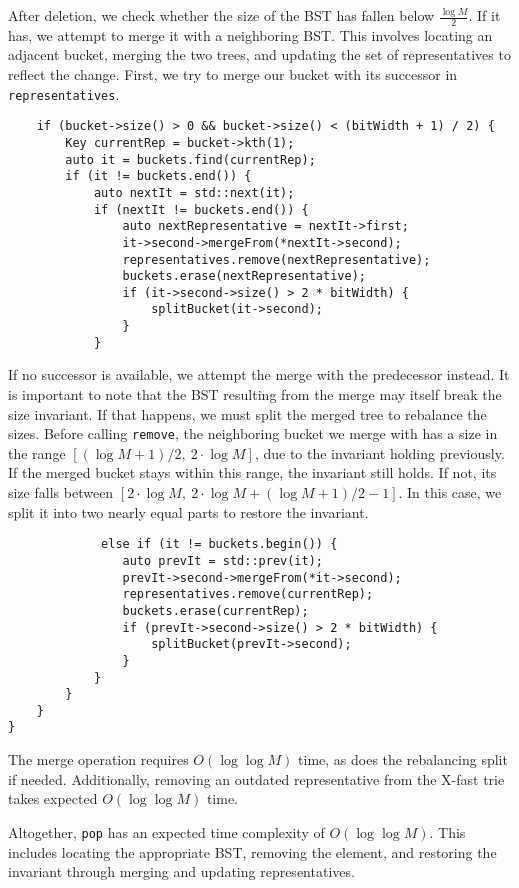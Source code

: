 After deletion, we check whether the size of the BST has fallen below \( \frac{\log M}{2} \). If it has, we attempt to merge it with a neighboring BST. This involves locating an adjacent bucket, merging the two trees, and updating the set of representatives to reflect the change. First, we try to merge our bucket with its successor in \texttt{representatives}.

\begin{verbatim}
    if (bucket->size() > 0 && bucket->size() < (bitWidth + 1) / 2) {
        Key currentRep = bucket->kth(1);
        auto it = buckets.find(currentRep);
        if (it != buckets.end()) {
            auto nextIt = std::next(it);
            if (nextIt != buckets.end()) {
                auto nextRepresentative = nextIt->first;
                it->second->mergeFrom(*nextIt->second);
                representatives.remove(nextRepresentative);
                buckets.erase(nextRepresentative);
                if (it->second->size() > 2 * bitWidth) {
                    splitBucket(it->second);
                }
            }
\end{verbatim}

If no successor is available, we attempt the merge with the predecessor instead. It is important to note that the BST resulting from the merge may itself break the size invariant. If that happens, we must split the merged tree to rebalance the sizes. Before calling \texttt{remove}, the neighboring bucket we merge with has a size in the range \([(\log M + 1)/2,\ 2 \cdot \log M ]\), due to the invariant holding previously. If the merged bucket stays within this range, the invariant still holds. If not, its size falls between \([ 2 \cdot \log M,\ 2 \cdot \log M + (\log M + 1)/2 - 1 ]\). In this case, we split it into two nearly equal parts to restore the invariant.

\begin{verbatim}
             else if (it != buckets.begin()) {
                auto prevIt = std::prev(it);
                prevIt->second->mergeFrom(*it->second);
                representatives.remove(currentRep);
                buckets.erase(currentRep);
                if (prevIt->second->size() > 2 * bitWidth) {
                    splitBucket(prevIt->second);
                }
            }
        }
    }
}
\end{verbatim}

The merge operation requires \( O(\log \log M) \) time, as does the rebalancing split if needed. Additionally, removing an outdated representative from the X-fast trie takes expected \( O(\log \log M) \) time.

Altogether, \texttt{pop} has an expected time complexity of \( O(\log \log M) \). This includes locating the appropriate BST, removing the element, and restoring the invariant through merging and updating representatives.
